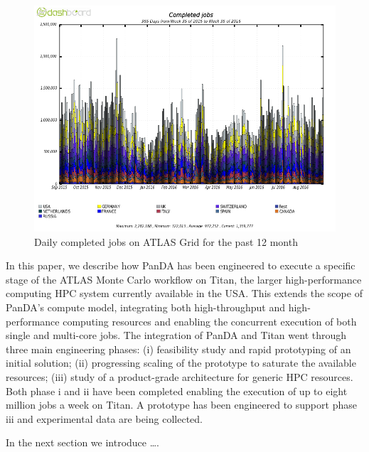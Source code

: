 \begin{figure}
    \begin{center}
        \includegraphics[width=\columnwidth]{figures/DailyJobs.png}
        \caption{Daily completed jobs on ATLAS Grid for the past 12 month}
    \end{center}
\label{fig:daily}
\end{figure}

In this paper, we describe how PanDA has been engineered to execute a specific
stage of the ATLAS Monte Carlo workflow on Titan, the larger high-performance
computing HPC system currently available in the USA\@. This extends
the scope of PanDA's compute model, integrating both high-throughput and
high-performance computing resources and enabling the concurrent execution of
both  single and multi-core jobs. The integration of PanDA and Titan went
through three main engineering phases: (i) feasibility study and rapid
prototyping of an initial solution; (ii) progressing scaling of the  prototype
to saturate the available resources; (iii) study of a product-grade architecture
for generic HPC resources. Both phase i and ii have been completed enabling the
execution of up to eight million jobs a week on Titan. A prototype has been
engineered to support phase iii and experimental data are being collected.

In the next section we introduce \ldots.
